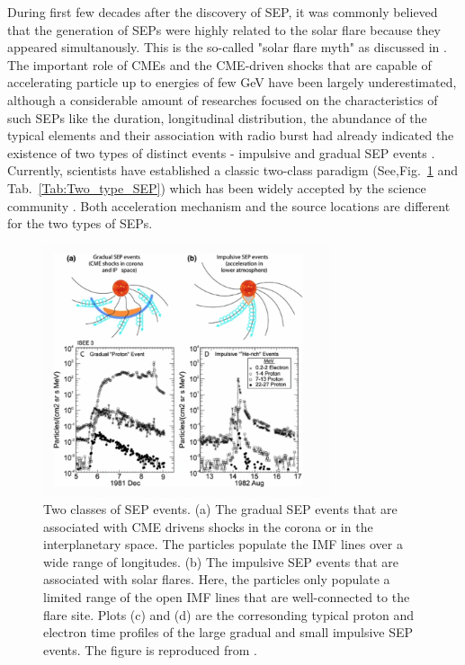 During first few decades after the discovery of \ac{SEP}, it was commonly believed that the generation of \acp{SEP} were highly related to the solar flare because they appeared simultanously. This is the so-called "solar flare myth" as discussed in \citep{gosling1993the}. The important role of \acp{CME} and the \ac{CME}-driven shocks that are capable of accelerating particle up to energies of few GeV have been largely underestimated,
 although a considerable amount of researches focused on the characteristics of such \acp{SEP} like the duration, longitudinal distribution, the abundance of the typical elements and their association with radio burst had already indicated the existence of two types of distinct events - impulsive and gradual \ac{SEP} events \citep{kahler1978prompt,kahler1984associations,cliver1982injection,cane1986two, reames1988ApJ}.
Currently, scientists have established a classic two-class paradigm (See,Fig.~\ref{Fig:two_type_SEP} and Tab.~\ref{Tab:Two_type_SEP}) which has been widely accepted by the science community \citep{kallenrode2003current, reames2013two,Desai_Diacalone2016LRSP, Reames2021LNP}. Both acceleration mechanism and the source locations are different for the two types of \acp{SEP}.
\begin{figure}[!htb]
	\centering
	\includegraphics[width = 0.75\textwidth]{images/SEP_two_type.png}
	\caption[Two types of Solar energetic particle (SEP) event]{Two classes of \ac{SEP} events. (a) The gradual \ac{SEP} events that are associated with \ac{CME} drivens shocks in the corona or in the interplanetary space. The particles populate the \ac{IMF} lines over a wide range of longitudes. (b) The impulsive \ac{SEP} events that are associated with solar flares. Here, the particles only populate a limited range of the open \ac{IMF} lines that are well-connected to the flare site. Plots (c) and (d) are the corresonding typical proton and electron time profiles of the large gradual and small impulsive SEP events. The figure is reproduced from \citet{Desai_Diacalone2016LRSP}.}
	\label{Fig:two_type_SEP}
\end{figure}

